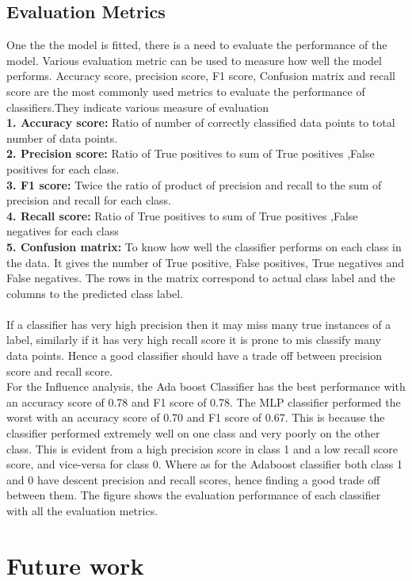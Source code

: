 \documentclass[sigconf]{acmart}
\begin{document}
\subsection{Evaluation Metrics}
One the the model is fitted, there is a need to evaluate the performance of the model. Various evaluation metric can be used to measure how well the model performs. Accuracy score, precision score, F1 score, Confusion matrix and recall score are the most commonly used metrics to evaluate the performance of classifiers.They indicate various measure of evaluation\\
\textbf{1. Accuracy score:} Ratio of number of correctly classified data points to total number of data points.\\
\textbf{2. Precision score:}  Ratio of True positives to sum of True positives ,False positives for each class.\\
\textbf{3. F1 score:} Twice the ratio of product of precision and recall to the sum of precision and recall for each class.\\
\textbf{4. Recall score:} Ratio of True positives to sum of True positives ,False negatives for each class\\
\textbf{5. Confusion matrix:} To know how well the classifier performs on each class in the data. It gives the number of True positive, False positives, True negatives and False negatives. The rows in the matrix correspond to actual class label and the columns to the predicted class label.\\\\
If a classifier has very high precision then it may miss many true instances of a label, similarly if it has very high recall score it is prone to mis classify many data points. Hence a good classifier should have a trade off between precision score and recall score.\\
For the Influence analysis, the Ada boost Classifier has the best performance with an accuracy score of 0.78 and F1 score of 0.78. The MLP classifier performed the worst with an accuracy score of 0.70 and F1 score of 0.67. This is because the  classifier performed extremely well on one class and very poorly on the other class. This is evident from a high precision score in class 1 and a low recall score score, and vice-versa for class 0. Where as for the Adaboost classifier both class 1 and 0 have descent precision and recall scores, hence finding a good trade off between them. The figure shows the evaluation performance of each classifier with all the evaluation metrics.  
\section{Future work}
\end{document}
